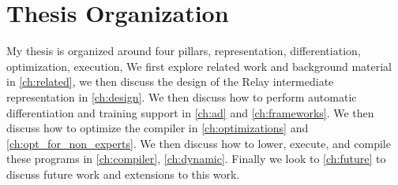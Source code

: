 \section{Thesis Organization}

My thesis is organized around four pillars, representation, differentiation, optimization, execution,
We first explore related work and background material
  in \ref{ch:related}, we then discuss the design of the Relay intermediate representation in \ref{ch:design}.
We then discuss how to perform automatic differentiation and training support in \ref{ch:ad} and
  \ref{ch:frameworks}.
We then discuss how to optimize the compiler in \ref{ch:optimizations} and \ref{ch:opt_for_non_experts}.
We then discuss how to lower, execute, and compile these programs in
\ref{ch:compiler}, \ref{ch:dynamic}.
Finally we look to \ref{ch:future} to discuss future work and extensions to this work.







